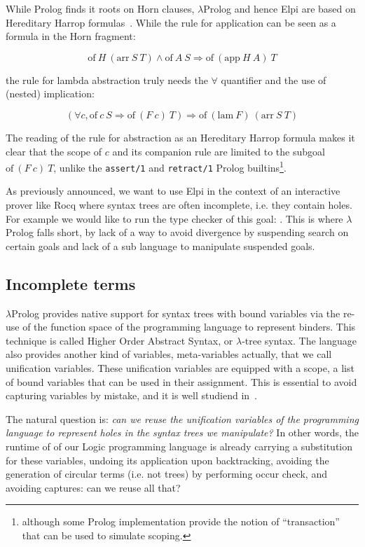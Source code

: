\documentclass[a4paper, 11pt]{book}
\begin{document}
While Prolog finds it roots on Horn clauses, $\lambda$Prolog and hence
Elpi are based on Hereditary Harrop formulas~\cite{Miller_Nadathur_2012}.
While the rule for application
can be seen as a formula in the Horn fragment:

$$
\mathrm{of}~ H~(\mathrm{arr}~S~T) \land \mathrm{of}~A~S \Rightarrow \mathrm{of}~(\mathrm{app}~H~A)~T
$$

\noindent the rule for lambda abstraction truly needs the $\forall$ quantifier
and the use of (nested) implication:

$$
(\forall c, \mathrm{of}~c~S \Rightarrow  \mathrm{of}~(F~c)~T) \Rightarrow \mathrm{of}~(\mathrm{lam}~F)~(\mathrm{arr}~S~T)
$$

The reading of the rule for abstraction as an Hereditary Harrop formula
makes it clear that the scope of $c$ and its companion rule
are limited to the subgoal $\mathrm{of}~(F~c)~T$,
unlike the \texttt{assert/1} and \texttt{retract/1} Prolog builtins\footnote{
  although some Prolog implementation provide the notion of ``transaction''
that can be used to simulate scoping.}.

As previously announced, we want to use Elpi in the context of an
interactive prover like Rocq where syntax trees are often incomplete, i.e.
they contain holes. For example we would like to run the
type checker of this goal: .
This is where $\lambda$Prolog falls short, by lack of a way to avoid
divergence by suspending search on certain goals and lack of a sub language
to manipulate suspended goals.


\subsection{Incomplete terms}

$\lambda$Prolog provides native support for syntax trees with bound
variables via the re-use of the function space of the programming language
to represent binders. This technique is called Higher Order Abstract Syntax,
or $\lambda$-tree syntax. The language also provides another kind
of variables, meta-variables actually, that we call unification variables.
These unification variables are equipped with a scope, a list of bound
variables that can be used in their assignment. This is essential to
avoid capturing variables by mistake, and it is well studiend in~\cite{miller92jsc}.

The natural question is: \emph{can we reuse the unification variables of
the programming language to represent holes in the syntax trees we manipulate?}
In other words, the runtime of of our Logic programming language is already
carrying a substitution for these variables, undoing its application upon
backtracking, avoiding the generation of circular terms (i.e. not trees)
by performing occur check, and avoiding captures: can we reuse all that?
\end{document}
